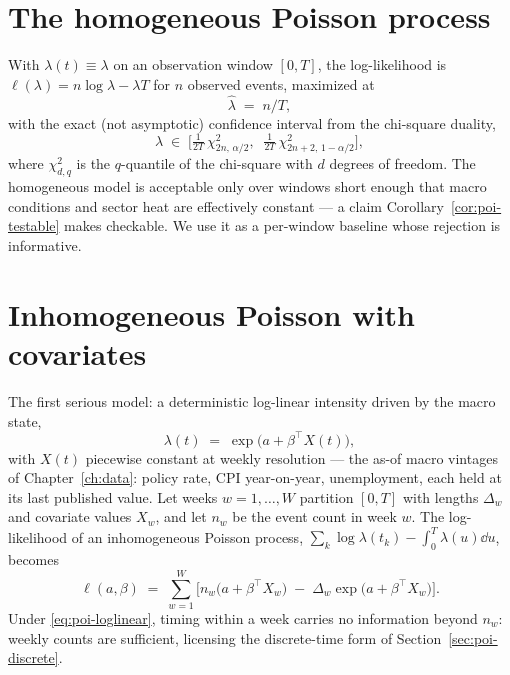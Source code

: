 \section{The homogeneous Poisson process}
\label{sec:poi-homog}

With $\lambda(t) \equiv \lambda$ on an observation window $[0, T]$, the log-likelihood is
$\ell(\lambda) = n \log \lambda - \lambda T$ for $n$ observed events, maximized at
\begin{equation}
\hat{\lambda} \;=\; n / T,
\label{eq:poi-homog-mle}
\end{equation}
with the exact (not asymptotic) confidence interval from the chi-square duality,
\begin{equation}
\lambda \;\in\; \Big[\tfrac{1}{2T}\,\chi^2_{2n,\,\alpha/2},\;\;
\tfrac{1}{2T}\,\chi^2_{2n+2,\,1-\alpha/2}\Big],
\label{eq:poi-homog-ci}
\end{equation}
where $\chi^2_{d,q}$ is the $q$-quantile of the chi-square with $d$ degrees of freedom.
The homogeneous model is acceptable only over windows short enough that macro conditions
and sector heat are effectively constant --- a claim Corollary~\ref{cor:poi-testable}
makes checkable. We use it as a per-window baseline whose rejection is informative.

\section{Inhomogeneous Poisson with covariates}
\label{sec:poi-inhomog}

The first serious model: a deterministic log-linear intensity driven by the macro state,
\begin{equation}
\lambda(t) \;=\; \exp\!\big(a + \beta^{\top} X(t)\big),
\label{eq:poi-loglinear}
\end{equation}
with $X(t)$ piecewise constant at weekly resolution --- the as-of macro vintages of
Chapter~\ref{ch:data}: policy rate, CPI year-on-year, unemployment, each held at its last
published value. Let weeks $w = 1, \dots, W$ partition $[0,T]$ with lengths $\Delta_w$ and
covariate values $X_w$, and let $n_w$ be the event count in week $w$. The log-likelihood
of an inhomogeneous Poisson process,
$\sum_k \log \lambda(t_k) - \int_0^T \lambda(u)\dd u$, becomes
\begin{equation}
\ell(a, \beta) \;=\; \sum_{w=1}^{W} \Big[ n_w \big(a + \beta^{\top} X_w\big)
\;-\; \Delta_w \exp\!\big(a + \beta^{\top} X_w\big) \Big].
\label{eq:poi-loglik}
\end{equation}
Under \eqref{eq:poi-loglinear}, timing within a week carries no information beyond $n_w$:
weekly counts are sufficient, licensing the discrete-time form of
Section~\ref{sec:poi-discrete}.

